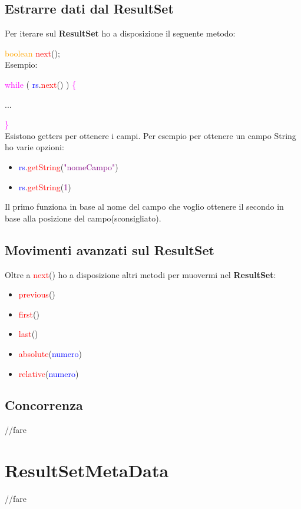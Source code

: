 \documentclass[11pt, letterpaper, titlepage]{article}
\begin{document}
\subsection{Estrarre dati dal ResultSet}
Per iterare sul \textbf{ResultSet} ho a disposizione il seguente metodo:\par
\textcolor{orange}{boolean} \textcolor{red}{next}();\\
Esempio:\par
\textcolor{magenta}{while} ( \textcolor{blue}{rs}.\textcolor{red}{next}() ) \textcolor{magenta}{\{}\par
...\par
\textcolor{magenta}{\}}\\
Esistono getters per ottenere i campi. Per esempio per ottenere un campo String ho varie
opzioni:
\begin{itemize}
    \item \textcolor{blue}{rs}.\textcolor{red}{getString}(\textcolor{purple}{"nomeCampo"})
    \item \textcolor{blue}{rs}.\textcolor{red}{getString}(\textcolor{purple}{1})
\end{itemize}
Il primo funziona in base al nome del campo che voglio ottenere il secondo in base alla
posizione del campo(sconsigliato).

\subsection{Movimenti avanzati sul ResultSet}
Oltre a \textcolor{red}{next}() ho a disposizione altri metodi per muovermi nel \textbf{ResultSet}:
\begin{itemize}
    \item \textcolor{red}{previous}()
    \item \textcolor{red}{first}()
    \item \textcolor{red}{last}()
    \item \textcolor{red}{absolute}(\textcolor{blue}{numero})
    \item \textcolor{red}{relative}(\textcolor{blue}{numero})
\end{itemize}

\subsection{Concorrenza}
//fare

\section{ResultSetMetaData}
//fare
\end{document}
